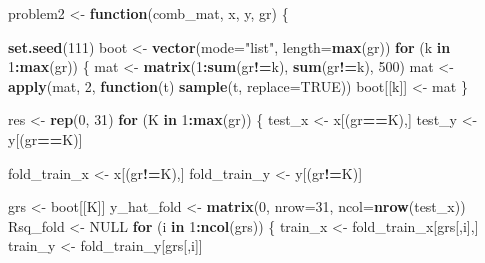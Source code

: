 \documentclass[
]{article}
\newenvironment{Shaded}{\begin{snugshade}}{\end{snugshade}}
\newcommand{\AttributeTok}[1]{\textcolor[rgb]{0.13,0.29,0.53}{#1}}
\newcommand{\ConstantTok}[1]{\textcolor[rgb]{0.56,0.35,0.01}{#1}}
\newcommand{\ControlFlowTok}[1]{\textcolor[rgb]{0.13,0.29,0.53}{\textbf{#1}}}
\newcommand{\DecValTok}[1]{\textcolor[rgb]{0.00,0.00,0.81}{#1}}
\newcommand{\FunctionTok}[1]{\textcolor[rgb]{0.13,0.29,0.53}{\textbf{#1}}}
\newcommand{\NormalTok}[1]{#1}
\newcommand{\OtherTok}[1]{\textcolor[rgb]{0.56,0.35,0.01}{#1}}
\newcommand{\SpecialCharTok}[1]{\textcolor[rgb]{0.81,0.36,0.00}{\textbf{#1}}}
\newcommand{\StringTok}[1]{\textcolor[rgb]{0.31,0.60,0.02}{#1}}
\begin{document}
\begin{Shaded}
\begin{Highlighting}[]
\NormalTok{problem2 }\OtherTok{\textless{}{-}} \ControlFlowTok{function}\NormalTok{(comb\_mat, x, y, gr) \{}
  
  \FunctionTok{set.seed}\NormalTok{(}\DecValTok{111}\NormalTok{)}
\NormalTok{  boot }\OtherTok{\textless{}{-}} \FunctionTok{vector}\NormalTok{(}\AttributeTok{mode=}\StringTok{"list"}\NormalTok{, }\AttributeTok{length=}\FunctionTok{max}\NormalTok{(gr))}
  \ControlFlowTok{for}\NormalTok{ (k }\ControlFlowTok{in} \DecValTok{1}\SpecialCharTok{:}\FunctionTok{max}\NormalTok{(gr)) \{}
\NormalTok{    mat }\OtherTok{\textless{}{-}} \FunctionTok{matrix}\NormalTok{(}\DecValTok{1}\SpecialCharTok{:}\FunctionTok{sum}\NormalTok{(gr}\SpecialCharTok{!=}\NormalTok{k), }\FunctionTok{sum}\NormalTok{(gr}\SpecialCharTok{!=}\NormalTok{k), }\DecValTok{500}\NormalTok{)}
\NormalTok{    mat }\OtherTok{\textless{}{-}} \FunctionTok{apply}\NormalTok{(mat, }\DecValTok{2}\NormalTok{, }\ControlFlowTok{function}\NormalTok{(t) }\FunctionTok{sample}\NormalTok{(t, }\AttributeTok{replace=}\ConstantTok{TRUE}\NormalTok{))}
\NormalTok{    boot[[k]] }\OtherTok{\textless{}{-}}\NormalTok{ mat}
\NormalTok{  \}}
  
\NormalTok{  res }\OtherTok{\textless{}{-}} \FunctionTok{rep}\NormalTok{(}\DecValTok{0}\NormalTok{, }\DecValTok{31}\NormalTok{)}
  \ControlFlowTok{for}\NormalTok{ (K }\ControlFlowTok{in} \DecValTok{1}\SpecialCharTok{:}\FunctionTok{max}\NormalTok{(gr)) \{}
\NormalTok{    test\_x }\OtherTok{\textless{}{-}}\NormalTok{ x[(gr}\SpecialCharTok{==}\NormalTok{K),]}
\NormalTok{    test\_y }\OtherTok{\textless{}{-}}\NormalTok{ y[(gr}\SpecialCharTok{==}\NormalTok{K)]}
    
\NormalTok{    fold\_train\_x }\OtherTok{\textless{}{-}}\NormalTok{ x[(gr}\SpecialCharTok{!=}\NormalTok{K),]}
\NormalTok{    fold\_train\_y }\OtherTok{\textless{}{-}}\NormalTok{ y[(gr}\SpecialCharTok{!=}\NormalTok{K)]}
    
\NormalTok{    grs }\OtherTok{\textless{}{-}}\NormalTok{ boot[[K]]}
\NormalTok{    y\_hat\_fold }\OtherTok{\textless{}{-}} \FunctionTok{matrix}\NormalTok{(}\DecValTok{0}\NormalTok{, }\AttributeTok{nrow=}\DecValTok{31}\NormalTok{, }\AttributeTok{ncol=}\FunctionTok{nrow}\NormalTok{(test\_x))}
\NormalTok{    Rsq\_fold }\OtherTok{\textless{}{-}} \ConstantTok{NULL}
    \ControlFlowTok{for}\NormalTok{ (i }\ControlFlowTok{in} \DecValTok{1}\SpecialCharTok{:}\FunctionTok{ncol}\NormalTok{(grs)) \{}
\NormalTok{      train\_x }\OtherTok{\textless{}{-}}\NormalTok{ fold\_train\_x[grs[,i],]}
\NormalTok{      train\_y }\OtherTok{\textless{}{-}}\NormalTok{ fold\_train\_y[grs[,i]]}
      

\end{Highlighting}
\end{Shaded}
\end{document}
